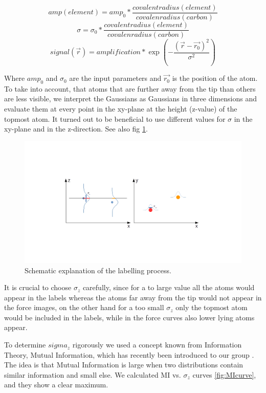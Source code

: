 \documentclass{article}
\begin{document}
\begin{equation}
amp(element) = amp_0 * \frac{covalent radius(element)}{covalen radius(carbon)}
\end{equation}
\begin{equation}
\sigma = \sigma_0 * \frac{covalent radius(element)}{covalen radius(carbon)}
\end{equation}
\begin{equation}
signal(\vec{r}) = amplification*\exp(-\frac{(\vec{r}-\vec{r_0})^2}{\sigma^2})
\end{equation}

Where $amp_0$ and $\sigma_0$ are the input parameters and $\vec{r_0}$ is the position of the atom. To take into account, that atoms that are further away from the tip than others are less visible, we interpret the Gaussians as Gaussians in three dimensions and evaluate them at every point in the xy-plane at the height (z-value) of the topmost atom. It turned out to be beneficial to use different values for $\sigma$ in the xy-plane and in the z-direction. See also fig \ref{fig:gaussians}.

 \begin{figure}[htbp]
 	\begin{center}
 		\includegraphics[width=12cm]{figs/gaussians.png}
 		\caption{Schematic explanation of the labelling process.}
 		\label{fig:gaussians}
 	\end{center}
 \end{figure}

It is crucial to choose $\sigma_z$ carefully, since for a to large value all the atoms would appear in the labels whereas the atoms far away from the tip would not appear in the force images, on the other hand for a too small $\sigma_z$ only the topmost atom would be included in the labels, while in the force curves also lower lying atoms appear.

To determine $sigma_z$ rigorously we used a concept known from Information Theory, Mutual Information, which has recently been introduced to our group \cite{MIestimator}. The idea is that Mutual Information is large when two distributions contain similar information and small else. We calculated MI vs. $\sigma_z$ curves \ref{fig:MIcurve}, and they show a clear maximum.
\end{document}
